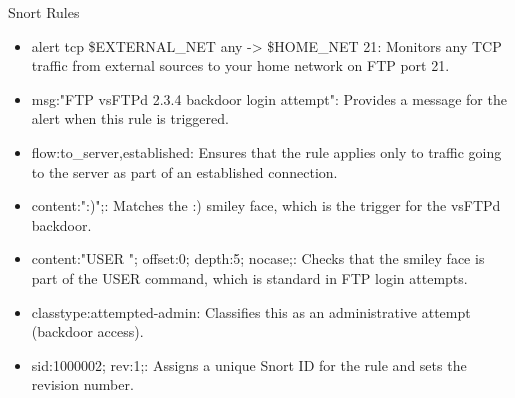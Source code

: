 \begin{frame}[t,allowframebreaks]{Snort Rules}
  \fontsize{13}{16}\selectfont
  \vspace{0.15cm}
  \begin{itemize}
    \item \textcolor{WarningColor}{alert tcp \$EXTERNAL\_NET any -> \$HOME\_NET 21}: Monitors any TCP traffic from external sources to your home network on FTP port 21.
    \item \textcolor{WarningColor}{msg:"FTP vsFTPd 2.3.4 backdoor login attempt"}: Provides a message for the alert when this rule is triggered.
    \item \textcolor{WarningColor}{flow:to\_server,established}: Ensures that the rule applies only to traffic going to the server as part of an established connection.
    \item \textcolor{WarningColor}{content:":)";}: Matches the :) smiley face, which is the trigger for the vsFTPd backdoor.
    \item \textcolor{WarningColor}{content:"USER "; offset:0; depth:5; nocase;}: Checks that the smiley face is part of the USER command, which is standard in FTP login attempts.
    \item \textcolor{WarningColor}{classtype:attempted-admin}: Classifies this as an administrative attempt (backdoor access).
    \item \textcolor{WarningColor}{sid:1000002; rev:1;}: Assigns a unique Snort ID for the rule and sets the revision number.
  \end{itemize}
\end{frame}
